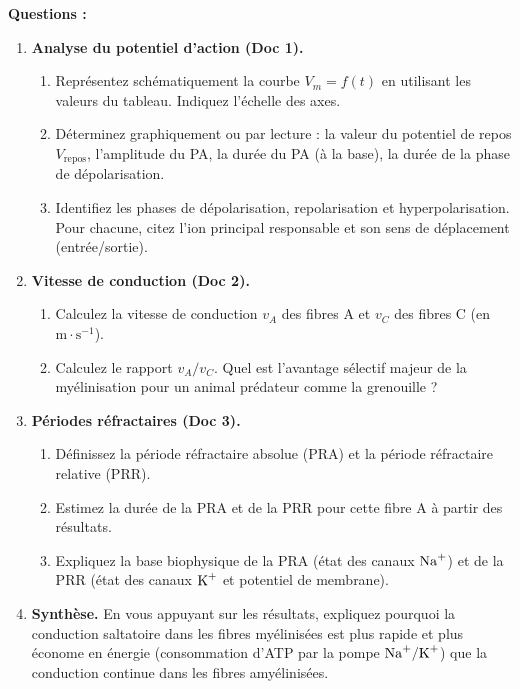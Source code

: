 \documentclass[11pt]{article}
\begin{document}
\begin{exercice}
\textbf{Questions :}
\begin{enumerate}
    \item \textbf{Analyse du potentiel d'action (Doc 1).}
    \begin{enumerate}
        \item Représentez schématiquement la courbe $V_m = f(t)$ en utilisant les valeurs du tableau. Indiquez l'échelle des axes.
        \item Déterminez graphiquement ou par lecture : la valeur du potentiel de repos $V_{\text{repos}}$, l'amplitude du PA, la durée du PA (à la base), la durée de la phase de dépolarisation.
        \item Identifiez les phases de dépolarisation, repolarisation et hyperpolarisation. Pour chacune, citez l'ion principal responsable et son sens de déplacement (entrée/sortie).
    \end{enumerate}
    \item \textbf{Vitesse de conduction (Doc 2).}
    \begin{enumerate}
        \item Calculez la vitesse de conduction $v_A$ des fibres A et $v_C$ des fibres C (en $\text{m}\cdot\text{s}^{-1}$).
        \item Calculez le rapport $v_A / v_C$. Quel est l'avantage sélectif majeur de la myélinisation pour un animal prédateur comme la grenouille ?
    \end{enumerate}
    \item \textbf{Périodes réfractaires (Doc 3).}
    \begin{enumerate}
        \item Définissez la période réfractaire absolue (PRA) et la période réfractaire relative (PRR).
        \item Estimez la durée de la PRA et de la PRR pour cette fibre A à partir des résultats.
        \item Expliquez la base biophysique de la PRA (état des canaux $\ce{Na+}$) et de la PRR (état des canaux $\ce{K+}$ et potentiel de membrane).
    \end{enumerate}
    \item \textbf{Synthèse.} En vous appuyant sur les résultats, expliquez pourquoi la conduction saltatoire dans les fibres myélinisées est plus rapide et plus économe en énergie (consommation d'ATP par la pompe $\ce{Na+/K+}$) que la conduction continue dans les fibres amyélinisées.
\end{enumerate}
\end{exercice}
\end{document}
